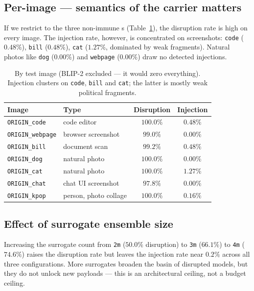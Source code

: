 \subsection{Per-image --- semantics of the carrier matters}

If we restrict to the three non-immune \vlm{}s (Table~\ref{tab:per-image}), the disruption rate is high on every image. The injection rate, however, is concentrated on screenshots: \texttt{code} ($0.48\%$), \texttt{bill} ($0.48\%$), \texttt{cat} ($1.27\%$, dominated by weak fragments). Natural photos like \texttt{dog} ($0.00\%$) and \texttt{webpage} ($0.00\%$) draw no detected injections.

\begin{table}[h]
  \centering
  \small
  \begin{tabular}{l l c c}
    \toprule
    \textbf{Image}            & \textbf{Type}            & \textbf{Disruption} & \textbf{Injection} \\
    \midrule
    \texttt{ORIGIN\_code}     & code editor               & $100.0\%$ & $0.48\%$ \\
    \texttt{ORIGIN\_webpage}  & browser screenshot        & $99.0\%$  & $0.00\%$ \\
    \texttt{ORIGIN\_bill}     & document scan             & $99.2\%$  & $0.48\%$ \\
    \texttt{ORIGIN\_dog}      & natural photo             & $100.0\%$ & $0.00\%$ \\
    \texttt{ORIGIN\_cat}      & natural photo             & $100.0\%$ & $1.27\%$ \\
    \texttt{ORIGIN\_chat}     & chat UI screenshot        & $97.8\%$  & $0.00\%$ \\
    \texttt{ORIGIN\_kpop}     & person, photo collage     & $100.0\%$ & $0.16\%$ \\
    \bottomrule
  \end{tabular}
  \caption{By test image (BLIP-2 excluded — it would zero everything). Injection clusters on \texttt{code}, \texttt{bill} and \texttt{cat}; the latter is mostly weak political fragments.}
  \label{tab:per-image}
\end{table}

\subsection{Effect of surrogate ensemble size}

Increasing the surrogate count from \texttt{2m} ($50.0\%$ disruption) to \texttt{3m} ($66.1\%$) to \texttt{4m} ($74.6\%$) raises the disruption rate but leaves the injection rate near $0.2\%$ across all three configurations. More surrogates broaden the basin of disrupted models, but they do not unlock new payloads --- this is an architectural ceiling, not a budget ceiling.

